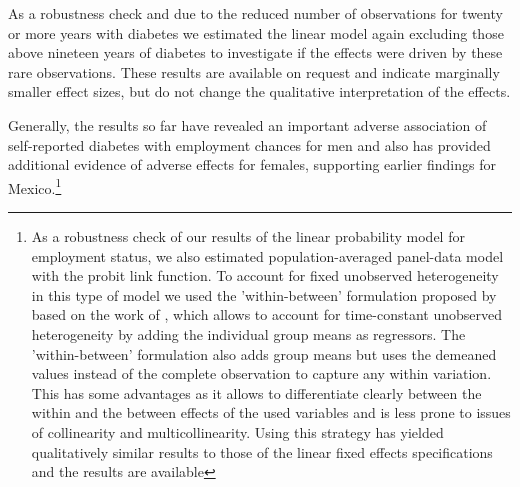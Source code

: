 \documentclass[12pt,english,british]{article}
\begin{document}
As a robustness check and due to the reduced number of observations for twenty or more years with diabetes we estimated the linear model again excluding those above nineteen years of diabetes to investigate if the effects were driven by these rare observations. These results are available on request and indicate marginally smaller effect sizes, but do not change the qualitative interpretation of the effects.

Generally, the results so far have revealed an important adverse association of self-reported diabetes with employment chances for men and also has provided additional evidence of adverse effects for females, supporting earlier findings for Mexico.\footnote{As  a robustness check of our results of the linear probability model for employment status, we also estimated population-averaged panel-data model with the probit link function. To account for fixed unobserved heterogeneity in this type of model we used the 'within-between' formulation proposed by \citet{Bell2015} based on the work of \citet{Mundlak1978}, which allows to account for time-constant unobserved heterogeneity by adding the individual group means as regressors. The 'within-between' formulation also adds group means but uses the demeaned values instead of the complete observation to capture any within variation. This has some advantages as it allows to differentiate clearly between the within and the between effects of the used variables and is less prone to issues of collinearity and multicollinearity. Using this
strategy has yielded qualitatively similar results to those of the
linear fixed effects specifications and the results are available
}
\end{document}
